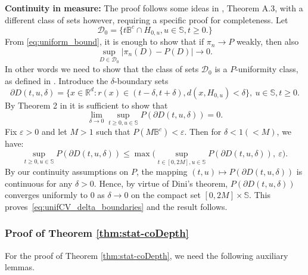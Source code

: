 \documentclass{article}
\numberwithin{equation}{section}
\newcommand{\rset}{\mathbb{R}}
\newcommand{\sphere}{\mathbb{S}}
\newcommand{\ball}{\mathbb{B}}
\newcommand{\AHS}[1]{H_{0, {#1}} }
\begin{document}
    \noindent\textbf{Continuity in measure:}
    The proof follows some ideas in \cite{NagyGijbels2016}, Theorem A.3, with a different class of sets however, requiring a specific proof for completeness. 
    Let \[\mathcal{D}_0 = \{ t\ball^c \cap \AHS{u}, u\in\sphere, t\ge 0.\}\]
    From \eqref{eq:uniform_bound}, it is enough to show that if $\pi_n\to P$ weakly, then also 
    \begin{equation}\label{eq:unif_cv_Pn_Dclass}
    \sup_{D\in\mathcal{D}_0}|\pi_n(D)-P(D)|\to 0.
    \end{equation}
    In other words we need to show that the class of sets $\mathcal{D}_0$ is a $P$-uniformity  class, as defined in \cite{billingsley1967uniformity}.
Introduce the $\delta$-boundary sets 
   $$\partial D(t,u,\delta) = \{ x\in\rset^d: r(x) \in (t-\delta, t+\delta), d(x, H_{0,u})<\delta \}, ~ u\in \sphere, t\ge 0.$$
      By Theorem 2 in \cite{billingsley1967uniformity} it is sufficient  to show that 
      \begin{equation}\label{eq:unifCV_delta_boundaries}
      \lim_{\delta\to 0} \sup_{t\ge 0, u \in\sphere } P(\partial D(t,u,\delta) ) = 0.     
      \end{equation}
      Fix $\varepsilon>0$ and let $M>1$
 such that $P(M\ball^c)< \varepsilon$. Then for $\delta<1(<M)$, we have:
 \begin{equation*}
     \sup_{t\ge 0, u \in\sphere } P(\partial D(t,u,\delta) ) \le 
   \max\Big(   \sup_{t\in[0,2 M], u \in\sphere } P(\partial D(t,u,\delta) ), ~\varepsilon \Big).
 \end{equation*}
 By our continuity assumptions on $P$, the mapping $(t,u)\mapsto P(\partial D(t,u,\delta) )$ is continuous for any $\delta>0$. Hence, by virtue of Dini's theorem, $P(\partial D(t,u,\delta) )$ converges uniformly to $0$ as $\delta\to 0$ on the compact set
 $[0,2M]\times \sphere$. This proves~\eqref{eq:unifCV_delta_boundaries} and the result follows. 



\subsubsection{Proof of Theorem \ref{thm:stat-coDepth}}
%
For the proof of Theorem \ref{thm:stat-coDepth}, we need
the following auxiliary lemmas.
\end{document}
